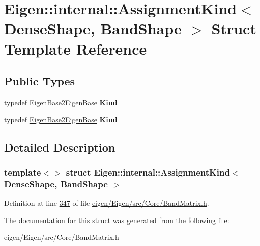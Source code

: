 \hypertarget{struct_eigen_1_1internal_1_1_assignment_kind_3_01_dense_shape_00_01_band_shape_01_4}{}\section{Eigen\+:\+:internal\+:\+:Assignment\+Kind$<$ Dense\+Shape, Band\+Shape $>$ Struct Template Reference}
\label{struct_eigen_1_1internal_1_1_assignment_kind_3_01_dense_shape_00_01_band_shape_01_4}
\subsection*{Public Types}
\begin{DoxyCompactItemize}
\item 
\mbox{\label{struct_eigen_1_1internal_1_1_assignment_kind_3_01_dense_shape_00_01_band_shape_01_4_a487d348b92386835d76b9ecc5110a02a}} 
typedef \hyperlink{struct_eigen_1_1internal_1_1_eigen_base2_eigen_base}{Eigen\+Base2\+Eigen\+Base} {\bfseries Kind}
\item 
\mbox{\label{struct_eigen_1_1internal_1_1_assignment_kind_3_01_dense_shape_00_01_band_shape_01_4_a487d348b92386835d76b9ecc5110a02a}} 
typedef \hyperlink{struct_eigen_1_1internal_1_1_eigen_base2_eigen_base}{Eigen\+Base2\+Eigen\+Base} {\bfseries Kind}
\end{DoxyCompactItemize}


\subsection{Detailed Description}
\subsubsection*{template$<$$>$\newline
struct Eigen\+::internal\+::\+Assignment\+Kind$<$ Dense\+Shape, Band\+Shape $>$}



Definition at line \hyperlink{eigen_2_eigen_2src_2_core_2_band_matrix_8h_source_l00347}{347} of file \hyperlink{eigen_2_eigen_2src_2_core_2_band_matrix_8h_source}{eigen/\+Eigen/src/\+Core/\+Band\+Matrix.\+h}.



The documentation for this struct was generated from the following file\+:\begin{DoxyCompactItemize}
\item 
eigen/\+Eigen/src/\+Core/\+Band\+Matrix.\+h\end{DoxyCompactItemize}
